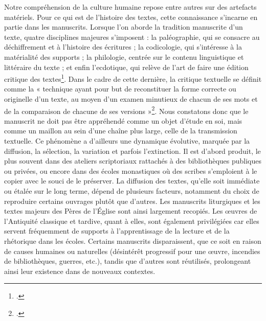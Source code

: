 \documentclass[a4paper,twoside,12pt]{book}
\begin{document}
Notre compréhension de la culture humaine repose entre autres sur des artefacts matériels. Pour ce qui est de l’histoire des textes, cette connaissance s’incarne en partie dans les manuscrits. Lorsque l’on aborde la tradition manuscrite d’un texte, quatre disciplines majeures s’imposent : la paléographie, qui se consacre au déchiffrement et à l’histoire des écritures ; la codicologie, qui s’intéresse à la matérialité des supports ; la philologie, centrée sur le contenu linguistique et littéraire du texte ; et enfin l’ecdotique, qui relève de l’art de faire une édition critique des textes\footcite{muzerelle}. Dans le cadre de cette dernière, la critique textuelle se définit comme la « technique ayant pour but de reconstituer la forme correcte ou originelle d'un texte, au moyen d'un examen minutieux de chacun de ses mots et de la comparaison de chacune de ses versions »\footcite{muzerelle}.
Nous constatons donc que le manuscrit ne doit pas être appréhendé comme un objet d’étude en soi, mais comme un maillon au sein d’une chaîne plus large,  celle de la transmission textuelle. Ce phénomène a d'ailleurs une dynamique évolutive, marquée par la diffusion, la sélection, la variation et parfois l’extinction. Il est d'abord produit, le plus souvent dans des ateliers scriptoriaux rattachés à des bibliothèques publiques ou privées, ou encore dans des écoles monastiques où des scribes s’emploient à le copier avec le souci de le préserver.
La diffusion des textes, qu’elle soit immédiate ou étalée sur le long terme, dépend de plusieurs facteurs, notamment du choix de reproduire certains ouvrages plutôt que d’autres. Les manuscrits liturgiques et les textes majeurs des Pères de l’Église sont ainsi largement recopiés. Les œuvres de l’Antiquité classique et tardive, quant à elles, sont également privilégiées car elles servent fréquemment de supports à l’apprentissage de la lecture et de la rhétorique dans les écoles. Certains manuscrits disparaissent, que ce soit en raison de causes humaines ou naturelles (désintérêt progressif pour une œuvre, incendies de bibliothèques, guerres, etc.), tandis que d’autres sont réutilisés, prolongeant ainsi leur existence dans de nouveaux contextes.
\end{document}
